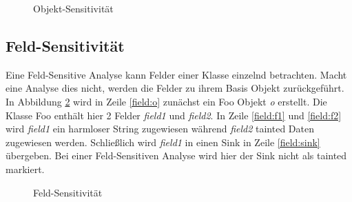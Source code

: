 \documentclass[runningheads]{llncs}
\begin{document}
\begin{figure}

\caption{Objekt-Sensitivität}
\label{fig:object_code} 
\end{figure}

\subsection{Feld-Sensitivität}
Eine Feld-Sensitive Analyse kann Felder einer Klasse einzelnd betrachten. Macht eine Analyse dies nicht, werden die Felder zu ihrem Basis Objekt zurückgeführt.
In Abbildung \ref{fig:field_code} wird in Zeile \ref{field:o} zunächst ein Foo Objekt \emph{o} erstellt. Die Klasse Foo enthält hier 2 Felder \emph{field1} und \emph{field2}. In Zeile \ref{field:f1} und \ref{field:f2} wird \emph{field1} ein harmloser String zugewiesen während \emph{field2} tainted Daten zugewiesen werden. Schließlich wird \emph{field1} in einen Sink in Zeile \ref{field:sink} übergeben. Bei einer Feld-Sensitiven Analyse wird hier der Sink nicht als tainted markiert.

\begin{figure}

\caption{Feld-Sensitivität}
\label{fig:field_code}
\end{figure}
\end{document}

